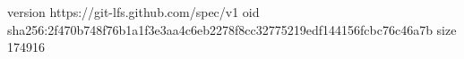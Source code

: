 version https://git-lfs.github.com/spec/v1
oid sha256:2f470b748f76b1a1f3e3aa4c6eb2278f8cc32775219edf144156fcbc76c46a7b
size 174916
